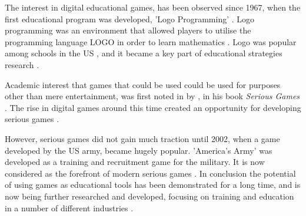 \documentclass[a4paper,11.5pt]{report}
\numberwithin{figure}{section}
\numberwithin{table}{section}
\numberwithin{equation}{section}
\numberwithin{equation}{section}
\begin{document}


The interest in digital educational games, has been observed since 1967, when the first educational program was developed, 'Logo Programming' \citep{hayes2008} . Logo programming was an environment that allowed players to utilise the programming language LOGO in order to learn mathematics \citep{feurzeig1969}. Logo was popular among schools in the US \citep{lehrer1986}, and it became a key part of educational strategies research \citep{hayes2008}. 

Academic interest that games that could be used could be used for purposes other than mere entertainment, was first noted in \citeyear{abt1970} by \citeauthor{abt1970}, in his book \textit{Serious Games} \citep{Breuer2010}. The rise in digital games around this time created an opportunity for developing serious games \citep{Wilkinson2016}. 

However, serious games did not gain much traction until 2002, when a game developed by the US army, became hugely popular. 'America's Army' was developed as a training and recruitment game for the military. It is now considered as the forefront of modern serious games \citep{Zyda2005, Wilkinson2016}. In conclusion the potential of using games as educational tools has been demonstrated for a long time, and is now being further researched and developed, focusing on training and education in a number of different industries \citep{Wilkinson2016}.


 
\end{document}
